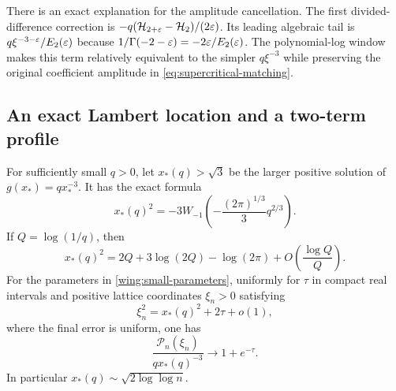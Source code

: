 There is an exact explanation for the amplitude cancellation.
The first divided-difference correction is
$-q(\mathcal H_{2+\varepsilon}-\mathcal H_2)/(2\varepsilon)$.
Its leading algebraic tail is
$q\xi^{-3-\varepsilon}/E_2(\varepsilon)$ because
$1/\Gamma(-2-\varepsilon)=-2\varepsilon/E_2(\varepsilon)$.
The polynomial-log window makes this term relatively equivalent to
the simpler $q\xi^{-3}$ while preserving the original coefficient
amplitude in \eqref{eq:supercritical-matching}.

\subsection{An exact Lambert location and a two-term profile}

\begin{theorem}
\label{thm:wing-lambert}
For sufficiently small $q>0$, let $x_*(q)>\sqrt3$ be the larger
positive solution of $g(x_*)=q x_*^{-3}$.  It has the exact formula
\begin{equation}\label{wing:lambert-center}
 x_*(q)^2
 =-3W_{-1}\left(-\frac{(2\pi)^{1/3}}3q^{2/3}\right).
\end{equation}
If $Q=\log(1/q)$, then
\begin{equation}\label{wing:expanded-center}
 x_*(q)^2
 =2Q+3\log(2Q)-\log(2\pi)
       +O\left(\frac{\log Q}{Q}\right).
\end{equation}
For the parameters in \eqref{wing:small-parameters}, uniformly
for $\tau$ in compact real intervals and positive lattice coordinates
$\xi_n>0$ satisfying
\begin{equation}\label{wing:transition-coordinate}
 \xi_n^2=x_*(q)^2+2\tau+o(1),
\end{equation}
where the final error is uniform, one has
\begin{equation}\label{wing:transition-profile}
 \frac{\mathcal P_n(\xi_n)}{qx_*(q)^{-3}}
       \longrightarrow 1+e^{-\tau}.
\end{equation}
In particular $x_*(q)\sim\sqrt{2\log\log n}$.
\end{theorem}

